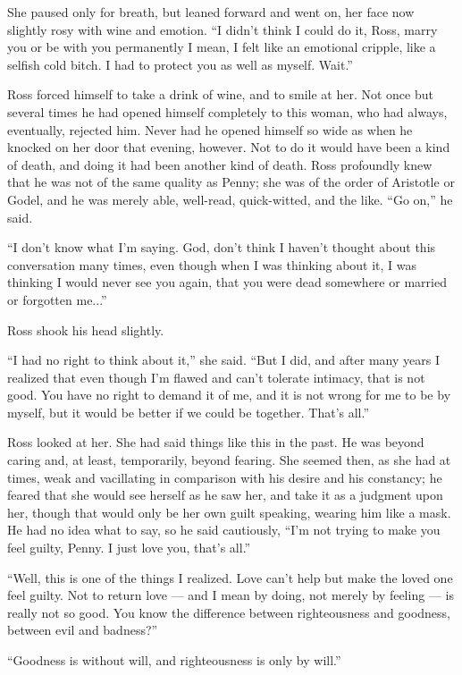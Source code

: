 \documentclass[english,11pt,letterpaper,onecolumn]{scrbook}
\begin{document}
	She paused only for breath, but leaned forward and went on, her face now slightly rosy with wine and emotion.  ``I didn't think I could do it, Ross, marry you or be with you permanently I mean, I felt like an emotional cripple, like a selfish cold bitch.  I had to protect you as well as myself.  Wait.''

	Ross forced himself to take a drink of wine, and to smile at her.  Not once but several times he had opened himself completely to this woman, who had always, eventually, rejected him.  Never had he opened himself so wide as when he knocked on her door that evening, however.  Not to do it would have been a kind of death, and doing it had been another kind of death.  Ross profoundly knew that he was not of the same quality as Penny; she was of the order of Aristotle or Godel, and he was merely able, well-read, quick-witted, and the like.  ``Go on,'' he said.

	``I don't know what I'm saying.  God, don't think I haven't thought about this conversation many times, even though when I was thinking about it, I was thinking I would never see you again, that you were dead somewhere or married or forgotten me...''

	Ross shook his head slightly.

	``I had no right to think about it,'' she said.  ``But I did, and after many years I realized that even though I'm flawed and can't tolerate intimacy, that is not good.  You have no right to demand it of me, and it is not wrong for me to be by myself, but it would be better if we could be together.  That's all.''

	Ross looked at her.  She had said things like this in the past.  He was beyond caring and, at least, temporarily, beyond fearing.  She seemed then, as she had at times, weak and vacillating in comparison with his desire and his constancy; he feared that she would see herself as he saw her, and take it as a judgment upon her, though that would only be her own guilt speaking, wearing him like a mask.  He had no idea what to say, so he said cautiously, ``I'm not trying to make you feel guilty, Penny.  I just love you, that's all.''

	``Well, this is one of the things I realized.  Love can't help but make the loved one feel guilty.  Not to return love --- and I mean by doing, not merely by feeling --- is really not so good.  You know the difference between righteousness and goodness, between evil and badness?''

	``Goodness is without will, and righteousness is only by will.''
\end{document}
